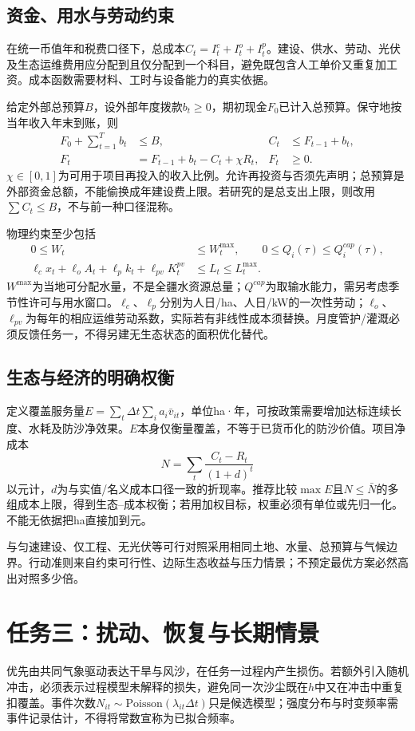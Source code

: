 \documentclass[11pt,a4paper]{ctexart}
\begin{document}
\subsection{资金、用水与劳动约束}
在统一币值年和税费口径下，总成本$C_t=I^c_t+I^o_t+I^p_t$。建设、供水、劳动、光伏及生态运维费用应分配到且仅分配到一个科目，避免既包含人工单价又重复加工资。成本函数需要材料、工时与设备能力的真实依据。

给定外部总预算$B$，设外部年度拨款$b_t\geq0$，期初现金$F_0$已计入总预算。保守地按当年收入年末到账，则
\begin{align}
 F_0+\sum_{t=1}^T b_t&\leq B, & C_t&\leq F_{t-1}+b_t,\\
 F_t&=F_{t-1}+b_t-C_t+\chi R_t, & F_t&\geq0.
\end{align}
$\chi\in[0,1]$为可用于项目再投入的收入比例。允许再投资与否须先声明；总预算是外部资金总额，不能偷换成年建设费上限。若研究的是总支出上限，则改用$\sum C_t\leq B$，不与前一种口径混称。

物理约束至少包括
\begin{align}
 0\leq W_t&\leq W^{\max}_t,\qquad 0\leq Q_i(\tau)\leq Q^{cap}_i(\tau),\\
 \ell_cx_t+\ell_oA_t+\ell_pk_t+\ell_{pv}K^{pv}_t&\leq L_t\leq L^{\max}_t.
\end{align}
$W^{\max}$为当地可分配水量，不是全疆水资源总量；$Q^{cap}$为取输水能力，需另考虑季节性许可与用水窗口。$\ell_c$、$\ell_p$分别为人日/ha、人日/kW的一次性劳动；$\ell_o$、$\ell_{pv}$为每年的相应运维劳动系数，实际若有非线性成本须替换。月度管护/灌溉必须反馈任务一，不得另建无生态状态的面积优化替代。

\subsection{生态与经济的明确权衡}
定义覆盖服务量$E=\sum_t\Delta t\sum_i a_i\bar v_{it}$，单位ha·年，可按政策需要增加达标连续长度、水耗及防沙净效果。$E$本身仅衡量覆盖，不等于已货币化的防沙价值。项目净成本
\begin{equation}
 N=\sum_t\frac{C_t-R_t}{(1+d)^t}
\end{equation}
以元计，$d$为与实值/名义成本口径一致的折现率。推荐比较$\max E$且$N\leq\bar N$的多组成本上限，得到生态--成本权衡；若用加权目标，权重必须有单位或先归一化。不能无依据把ha直接加到元。

与匀速建设、仅工程、无光伏等可行对照采用相同土地、水量、总预算与气候边界。行动准则来自约束可行性、边际生态收益与压力情景；不预定最优方案必然高出对照多少倍。

\section{任务三：扰动、恢复与长期情景}
优先由共同气象驱动表达干旱与风沙，在任务一过程内产生损伤。若额外引入随机冲击，必须表示过程模型未解释的损失，避免同一次沙尘既在$h$中又在冲击中重复扣覆盖。事件次数$N_{it}\sim\mathrm{Poisson}(\lambda_{it}\Delta t)$只是候选模型；强度分布与时变频率需事件记录估计，不得将常数宣称为已拟合频率。
\end{document}
